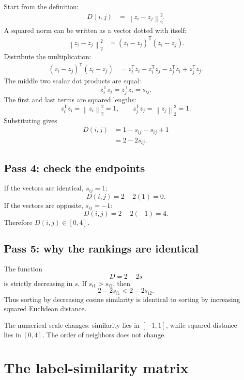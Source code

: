 \documentclass[11pt,oneside,openany]{book}
\theoremstyle{myplain}
\theoremstyle{definition}
\newcommand{\norm}[1]{\left\lVert #1\right\rVert}
\begin{document}
Start from the definition:
\begin{align}
D(i,j)
  &=\norm{z_i-z_j}_2^2. \label{eq:dist-step1}
\end{align}
A squared norm can be written as a vector dotted with itself:
\begin{align}
  \norm{z_i-z_j}_2^2
  &=(z_i-z_j)^{\mathsf T}(z_i-z_j). \label{eq:dist-step2}
\end{align}
Distribute the multiplication:
\begin{align}
(z_i-z_j)^{\mathsf T}(z_i-z_j)
  &=z_i^{\mathsf T}z_i-z_i^{\mathsf T}z_j-z_j^{\mathsf T}z_i+z_j^{\mathsf T}z_j. \label{eq:dist-step3}
\end{align}
The middle two scalar dot products are equal:
\[
  z_i^{\mathsf T}z_j=z_j^{\mathsf T}z_i=s_{ij}.
\]
The first and last terms are squared lengths:
\[
  z_i^{\mathsf T}z_i=\norm{z_i}_2^2=1,
  \qquad
  z_j^{\mathsf T}z_j=\norm{z_j}_2^2=1.
\]
Substituting gives
\begin{align*}
D(i,j)
  &=1-s_{ij}-s_{ij}+1\\
  &=2-2s_{ij}.
\end{align*}

\subsection{Pass 4: check the endpoints}

If the vectors are identical, $s_{ij}=1$:
\[
  D(i,j)=2-2(1)=0.
\]
If the vectors are opposite, $s_{ij}=-1$:
\[
  D(i,j)=2-2(-1)=4.
\]
Therefore $D(i,j)\in[0,4]$.

\subsection{Pass 5: why the rankings are identical}

The function
\[
  D=2-2s
\]
is strictly decreasing in $s$. If $s_{i1}>s_{i2}$, then
\[
  2-2s_{i1}<2-2s_{i2}.
\]
Thus sorting by decreasing cosine similarity is identical to sorting by increasing squared Euclidean distance.

\begin{conceptbox}[title=What changes and what does not]
The numerical scale changes: similarity lies in $[-1,1]$, while squared distance lies in $[0,4]$. The order of neighbors does not change.
\end{conceptbox}

\section{The label-similarity matrix}
\end{document}
